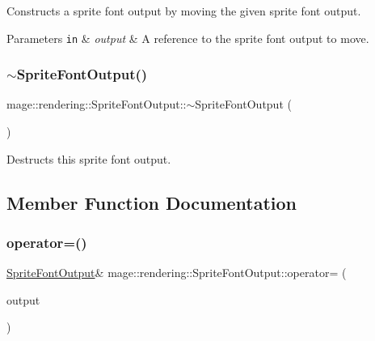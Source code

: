 Constructs a sprite font output by moving the given sprite font output.


\begin{DoxyParams}[1]{Parameters}
\mbox{\tt in}  & {\em output} & A reference to the sprite font output to move. \\
\hline
\end{DoxyParams}
\hypertarget{structmage_1_1rendering_1_1_sprite_font_output_ac271cd1aa65291b2403555b8c230b702}{}\label{structmage_1_1rendering_1_1_sprite_font_output_ac271cd1aa65291b2403555b8c230b702} 
\subsubsection{\texorpdfstring{$\sim$\+Sprite\+Font\+Output()}{~SpriteFontOutput()}}
{\footnotesize\ttfamily mage\+::rendering\+::\+Sprite\+Font\+Output\+::$\sim$\+Sprite\+Font\+Output (\begin{DoxyParamCaption}{ }\end{DoxyParamCaption})\hspace{0.3cm}{\ttfamily [default]}}

Destructs this sprite font output. 

\subsection{Member Function Documentation}
\hypertarget{structmage_1_1rendering_1_1_sprite_font_output_a0b94e62b46d2b75d05eff13f8909f1cc}{}\label{structmage_1_1rendering_1_1_sprite_font_output_a0b94e62b46d2b75d05eff13f8909f1cc} 
\subsubsection{\texorpdfstring{operator=()}{operator=()}\hspace{0.1cm}{\footnotesize\ttfamily [1/2]}}
{\footnotesize\ttfamily \hyperlink{structmage_1_1rendering_1_1_sprite_font_output}{Sprite\+Font\+Output}\& mage\+::rendering\+::\+Sprite\+Font\+Output\+::operator= (\begin{DoxyParamCaption}\item[{const \hyperlink{structmage_1_1rendering_1_1_sprite_font_output}{Sprite\+Font\+Output} \&}]{output }\end{DoxyParamCaption})\hspace{0.3cm}{\ttfamily [delete]}}

